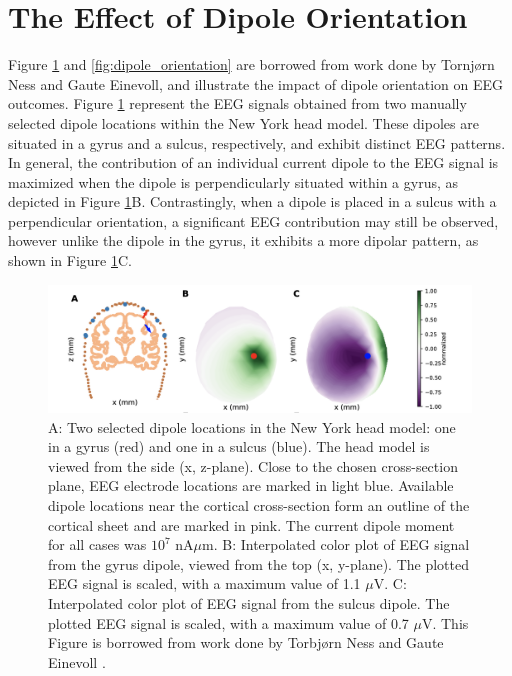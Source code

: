\documentclass[a4paper, UKenglish, 11pt]{uiomaster}
\begin{document}
\section{The Effect of Dipole Orientation}
Figure \ref{fig:gyrus_and_sulcus_EEG} and \ref{fig:dipole_orientation} are borrowed from work done by Tornjørn Ness and Gaute Einevoll, and illustrate the impact of dipole orientation on EEG outcomes. Figure \ref{fig:gyrus_and_sulcus_EEG} represent the EEG signals obtained from two manually selected dipole locations within the New York head model. These dipoles are situated in a gyrus and a sulcus, respectively, and exhibit distinct EEG patterns. In general, the contribution of an individual current dipole to the EEG signal is maximized when the dipole is perpendicularly situated within a gyrus, as depicted in Figure \ref{fig:gyrus_and_sulcus_EEG}B. Contrastingly, when a dipole is placed in a sulcus with a perpendicular orientation, a significant EEG contribution may still be observed, however unlike the dipole in the gyrus, it exhibits a more dipolar pattern, as shown in Figure \ref{fig:gyrus_and_sulcus_EEG}C.


\begin{figure}[!htb]
    \centering
    \includegraphics[width=\linewidth]{figures/gyrus_and_sulcus_EEG.png}
    \caption{A: Two selected dipole locations in the New York head model: one in a gyrus (red) and one in a sulcus (blue). The head model is viewed from the side (x, z-plane). Close to the chosen cross-section plane, EEG electrode locations are marked in light blue. Available dipole locations near the cortical cross-section form an outline of the cortical sheet and are marked in pink. The current dipole moment for all cases was $10^7$ nA$\mu$m. B: Interpolated color plot of EEG signal from the gyrus dipole, viewed from the top (x, y-plane). The plotted EEG signal is scaled, with a maximum value of 1.1 $\mu$V. C: Interpolated color plot of EEG signal from the sulcus dipole. The plotted EEG signal is scaled, with a maximum value of 0.7 $\mu$V. This Figure is borrowed from work done by Torbjørn Ness and Gaute Einevoll \cite{naess2021biophysically}.}
    \label{fig:gyrus_and_sulcus_EEG}
\end{figure}
\end{document}
